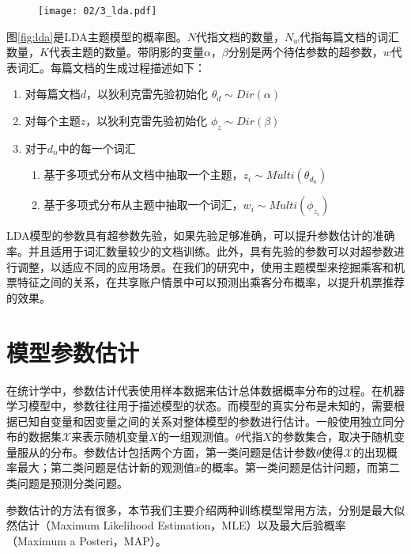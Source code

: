 \begin{figure}[!h]
 \centering
 \texttt{[image: 02/3\_lda.pdf]}
\end{figure}

图\ref{fig:lda}是LDA主题模型的概率图。$N$代指文档的数量，$N_w$代指每篇文档的词汇数量，$K$代表主题的数量。带阴影的变量$\alpha$，$\beta$分别是两个待估参数的超参数，$w$代表词汇。每篇文档的生成过程描述如下：

\begin{enumerate}
\item 对每篇文档$d$，以狄利克雷先验初始化 $\theta_d \sim Dir(\alpha)$
\item 对每个主题$z$，以狄利克雷先验初始化 $\phi_z \sim Dir(\beta)$
\item 对于$d_n$中的每一个词汇
       \begin{enumerate}[fullwidth,itemindent=1em,label=(\alph*)]
       \item 基于多项式分布从文档中抽取一个主题，$z_i \sim Multi(\theta_{d_n})$
       \item 基于多项式分布从主题中抽取一个词汇，$w_i \sim Multi(\phi_{z_i})$
       \end{enumerate}
\end{enumerate}

LDA模型的参数具有超参数先验，如果先验足够准确，可以提升参数估计的准确率。并且适用于词汇数量较少的文档训练。此外，具有先验的参数可以对超参数进行调整，以适应不同的应用场景。在我们的研究中，使用主题模型来挖掘乘客和机票特征之间的关系，在共享账户情景中可以预测出乘客分布概率，以提升机票推荐的效果。

\section{模型参数估计}

在统计学中，参数估计\parencite{heinrich2008parameter}代表使用样本数据来估计总体数据概率分布的过程。在机器学习模型中，参数往往用于描述模型的状态。而模型的真实分布是未知的，需要根据已知自变量和因变量之间的关系对整体模型的参数进行估计。一般使用独立同分布的数据集$\mathcal{X}$来表示随机变量$X$的一组观测值。$\theta$代指$X$的参数集合，取决于随机变量服从的分布。参数估计包括两个方面，第一类问题是估计参数$\theta$使得$\mathcal{X}$的出现概率最大；第二类问题是估计新的观测值$\tilde{x}$的概率。第一类问题是估计问题，而第二类问题是预测分类问题。

参数估计的方法有很多，本节我们主要介绍两种训练模型常用方法，分别是最大似然估计（Maximum Likelihood Estimation，MLE）\parencite{johansen1990maximum}以及最大后验概率（Maximum a Posteri，MAP）\parencite{gauvain1994maximum}。

